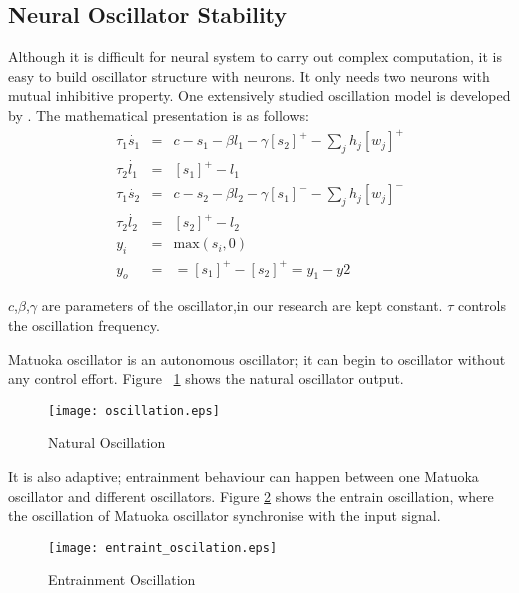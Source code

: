 \subsection{Neural Oscillator Stability}


Although it is difficult for neural system to carry out complex computation, it is easy to build oscillator structure with neurons. 
It only needs two neurons with mutual inhibitive property.
One extensively studied oscillation model is developed by \citet{neurooscillation}. 
The mathematical presentation is as follows:
\begin{eqnarray}
\tau_{1} \dot{s_{1}}&=&c-s_{1}-\beta l_{1}-\gamma [s_{2}]^{+}-\sum_{j}h_{j}[w_{j}]^{+}\\
\tau_{2} \dot{l_{1}}&=&[s_{1}]^{+}-l_{1}\\
\tau_{1} \dot{s_{2}}&=&c-s_{2}-\beta l_{2}-\gamma [s_{1}]^{-}-\sum_{j}h_{j}[w_{j}]^{-}\\
\tau_{2} \dot{l_{2}}&=&[s_{2}]^{+}-l_{2}\\
y_{i}&=&\mbox{max}(s_{i},0)\\
y_{o}&=&=[s_{1}]^{+}-[s_{2}]^{+}=y_{1}-y{2}
\label{eq:matsuta}
\end{eqnarray}

$c$,$\beta$,$\gamma$ are parameters of the oscillator,in our research are kept constant.
$\tau$ controls the oscillation frequency.







Matuoka oscillator is an autonomous oscillator; 
it can begin to oscillator without any control effort.
Figure ~\ref{fig:natural-oscilation} shows the natural oscillator output.
\begin{figure}[h]
\texttt{[image: oscillation.eps]}
\caption{Natural Oscillation}
\label{fig:natural-oscilation}
\end{figure}





It is also adaptive; entrainment behaviour can happen between one Matuoka oscillator and different oscillators. 
Figure \ref{fig:entraint-oscilation} shows the entrain oscillation,
where the oscillation of Matuoka oscillator synchronise with the input signal.
\begin{figure}[h]
\texttt{[image: entraint\_oscilation.eps]}
\caption{Entrainment Oscillation}
\label{fig:entraint-oscilation}
\end{figure}

